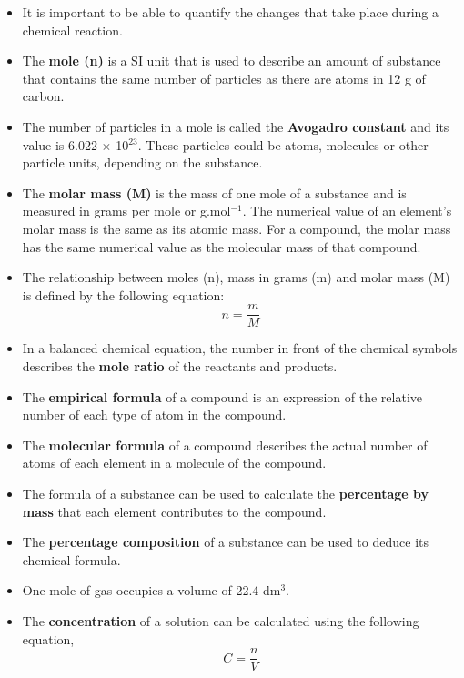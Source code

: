 \begin{itemize}
\item{It is important to be able to quantify the changes that take place during a chemical reaction.}
\item{The \textbf{mole (n)} is a SI unit that is used to describe an amount of substance that contains the same number of particles as there are atoms in 12 g of carbon.}
\item{The number of particles in a mole is called the \textbf{Avogadro constant} and its value is 6.022 $\times$ 10$^{23}$. These particles could be atoms, molecules or other particle units, depending on the substance.}
\item{The \textbf{molar mass (M)} is the mass of one mole of a substance and is measured in grams per mole or g.mol$^{-1}$. The numerical value of an element's molar mass is the same as its atomic mass. For a compound, the molar mass has the same numerical value as the molecular mass of that compound.}
\item{The relationship between moles (n), mass in grams (m) and molar mass (M) is defined by the following equation:
\begin{equation*}
n = \frac{m}{M}
\end{equation*}
}
\item{In a balanced chemical equation, the number in front of the chemical symbols describes the \textbf{mole ratio} of the reactants and products.}
\item{The \textbf{empirical formula} of a compound is an expression of the relative number of each type of atom in the compound.}
\item{The \textbf{molecular formula} of a compound describes the actual number of atoms of each element in a molecule of the compound.}
\item{The formula of a substance can be used to calculate the \textbf{percentage by mass} that each element contributes to the compound.}
\item{The \textbf{percentage composition} of a substance can be used to deduce its chemical formula.}
\item{One mole of gas occupies a volume of 22.4 dm$^{3}$.}
\item{The \textbf{concentration} of a solution can be calculated using the following equation,
\begin{equation*}
C = \frac{n}{V}
\end{equation*}

}
\end{itemize}
